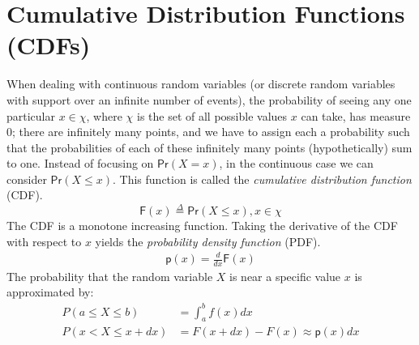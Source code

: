 \documentclass[twoside]{article}
\def\defn{\stackrel{\Delta}{=}} %
\def\F{\textsf{F}} %
\def\Pr{\textsf{Pr}} %
\def\p{\textsf{p}} %
\begin{document}
\section*{Cumulative Distribution Functions (CDFs)}
When dealing with continuous random variables (or discrete random variables with support over an infinite number of events), the probability of seeing any one particular $x \in \chi$, where $\chi$ is the set of all possible values $x$ can take, has measure 0; there are infinitely many points, and we have to assign each a probability such that the probabilities of each of these infinitely many points (hypothetically) sum to one. Instead of focusing on $\Pr(X=x)$, in the continuous case we can consider $\Pr(X \leq x)$. This function is called the \emph{cumulative distribution function} (CDF). 
$$ \F(x) \defn \Pr(X \leq x), x \in \chi $$
The CDF is a monotone increasing function. Taking the derivative of the CDF with respect to $x$ yields the \emph{probability density function} (PDF). 
\begin{align*}
 \p(x) = \frac{d}{dx} \F(x)
\end{align*}
The probability that the random variable $X$ is near a specific value $x$ is approximated by:
\begin{align*}
 P(a \leq X \leq b) & = \int_{a}^{b} f(x) dx \\
 P(x < X \leq x + dx)& = F(x + dx) - F(x)  \approx \p(x) dx 
\end{align*}
\end{document}

